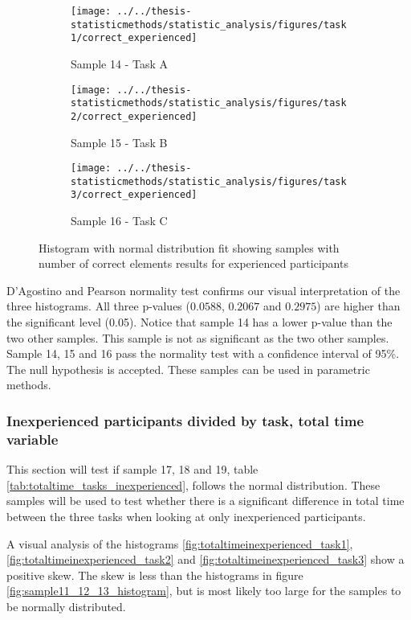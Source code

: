 \begin{figure}[H]
	\centering
	\begin{subfigure}[b]{0.32\textwidth}
		\centering
		\texttt{[image: ../../thesis-statisticmethods/statistic\_analysis/figures/task1/correct\_experienced]}
		\caption{Sample 14 - Task A}
		\label{fig:correctexperienced_task1}
	\end{subfigure}
	\begin{subfigure}[b]{0.32\textwidth}
		\centering
		\texttt{[image: ../../thesis-statisticmethods/statistic\_analysis/figures/task2/correct\_experienced]}
		\caption{Sample 15 - Task B}
		\label{fig:correctexperienced_task2}
	\end{subfigure}
	\begin{subfigure}[b]{0.32\textwidth}
		\centering
		\texttt{[image: ../../thesis-statisticmethods/statistic\_analysis/figures/task3/correct\_experienced]}
		\caption{Sample 16 - Task C}
		\label{fig:correctexperienced_task3}
	\end{subfigure}
	\caption{Histogram with normal distribution fit showing samples with number of correct elements results for experienced participants}
	\label{fig:sample14,15,16_normhistogram}
\end{figure}

 D'Agostino and Pearson normality test confirms our visual interpretation of the three histograms. All three p-values ($0.0588$, $0.2067$ and $0.2975$) are higher than the significant level (0.05). Notice that sample 14 has a lower p-value than the two other samples. This sample is not as significant as the two other samples. Sample 14, 15 and 16 pass the normality test with a confidence interval of 95\%. The null hypothesis is accepted. These samples can be used in parametric methods. 

\subsubsection[Sample 17, 18 and 19]{Inexperienced participants divided by task, total time variable}\label{sec:sample_17,18,19_normalitytest}
This section will test if sample 17, 18 and 19, table \ref{tab:totaltime_tasks_inexperienced}, follows the normal distribution. These samples will be used to test whether there is a significant difference in total time between the three tasks when looking at only inexperienced participants.

A visual analysis of the histograms \ref{fig:totaltimeinexperienced_task1}, \ref{fig:totaltimeinexperienced_task2} and \ref{fig:totaltimeinexperienced_task3} show a positive skew. The skew is less than the histograms in figure \ref{fig:sample11_12_13_histogram}, but is most likely too large for the samples to be normally distributed.


